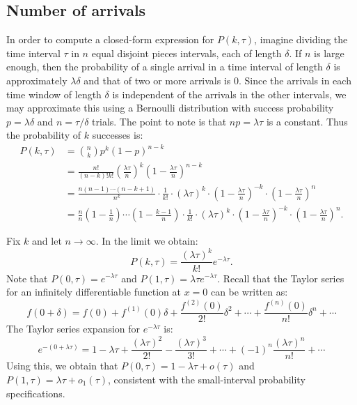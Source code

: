 \subsection{Number of arrivals}
In order to compute a closed-form expression for $P(k, \tau)$, imagine dividing the time interval $\tau$ in $n$ equal disjoint
pieces intervals, each of length $\delta$. If $n$ is large enough, then the probability of a single arrival in a time interval of length $\delta$
is approximately $\lambda \delta$ and that of two or more arrivals is $0$. Since the arrivals in each time window of length
$\delta$ is independent of the arrivals in the other intervals, we may approximate this using a Bernoulli distribution with
success probability $p = \lambda \delta$ and $n = \tau / \delta$ trials. The point to note is that $np = \lambda \tau$
is a constant. Thus the probability of $k$ successes is:
\begin{align*}
    P(k, \tau) & = {n \choose k} p^{k} (1 - p)^{n - k} \\
               & = \frac{n!}{(n - k)! k!} \left ( \frac{\lambda \tau}{n}\right )^k \left ( 1 - \frac{\lambda \tau}{n} \right )^{n - k} \\
               & = \frac{n (n - 1) \cdots (n - k + 1)}{n^k} \cdot \frac{1}{k!} \cdot (\lambda \tau)^{k}
                    \cdot \left ( 1 - \frac{\lambda \tau}{n} \right )^{-k} \cdot \left ( 1 - \frac{\lambda \tau}{n} \right )^{n} \\
               & = \frac{n}{n} \left ( 1 - \frac{1}{n} \right ) \cdots \left ( 1 - \frac{k - 1}{n} \right ) \cdot \frac{1}{k!} \cdot (\lambda \tau)^{k}
                    \cdot \left ( 1 - \frac{\lambda \tau}{n} \right )^{-k} \cdot \left ( 1 - \frac{\lambda \tau}{n} \right )^{n}.
\end{align*}

Fix $k$ and let $n \to \infty$. In the limit we obtain:
\[
    P(k, \tau) = \frac{(\lambda \tau)^k}{k!} e^{- \lambda \tau}.
\]
Note that $P(0, \tau) = e^{- \lambda \tau}$ and $P(1, \tau) = \lambda \tau e^{- \lambda \tau}$. Recall that the Taylor series
for an infinitely differentiable function at $x = 0$ can be written as:
\[
    f(0 + \delta) = f(0) + f^{(1)}(0) \delta + \frac{f^{(2)}(0)}{2!} \delta^2 + \cdots + \frac{f^{(n)}(0)}{n!} \delta^n + \cdots
\]
The Taylor series expansion for $e^{-\lambda \tau}$ is:
\[
    e^{-(0 + \lambda \tau)} = 1 - \lambda \tau + \frac{(\lambda \tau)^2}{2!} - \frac{(\lambda \tau)^3}{3!} +
                        \cdots + (-1)^n \frac{(\lambda \tau)^n}{n!} + \cdots
\]
Using this, we obtain that $P(0, \tau) =  1 - \lambda \tau + o(\tau)$ and $P(1, \tau) = \lambda \tau + o_1(\tau)$, consistent with
the small-interval probability specifications.
